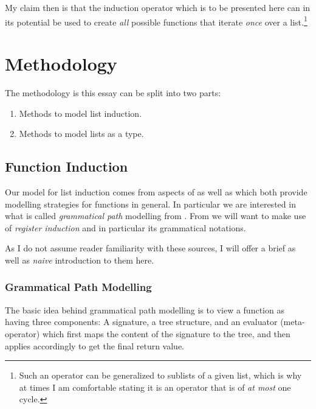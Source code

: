 \documentclass[twoside]{article}
\begin{document}
My claim then is that the induction operator which is to be presented here can in its potential be used to create \emph{all}
possible functions that iterate \emph{once} over a list.\footnote{Such an operator can be generalized to sublists of a given
list, which is why at times I am comfortable stating it is an operator that is of \emph{at most} one cycle.}

\section*{Methodology}

The methodology is this essay can be split into two parts:

\begin{enumerate}
\item Methods to model list induction.
\item Methods to model lists as a type.
\end{enumerate}

\subsection*{Function Induction}

Our model for list induction comes from aspects of \cite{nikfs} as well as \cite{nikfi} which both provide modelling strategies
for functions in general. In particular we are interested in what is called \emph{grammatical path} modelling from \cite{nikfs}.
From \cite{nikfi} we will want to make use of \emph{register induction} and in particular its grammatical notations.

As I do not assume reader familiarity with these sources, I will offer a brief as well as \emph{naive} introduction to them here.

\subsubsection*{Grammatical Path Modelling}

The basic idea behind grammatical path modelling is to view a function as having three components: A signature, a tree structure,
and an evaluator (meta-operator) which first maps the content of the signature to the tree, and then applies accordingly to get
the final return value.
\end{document}
